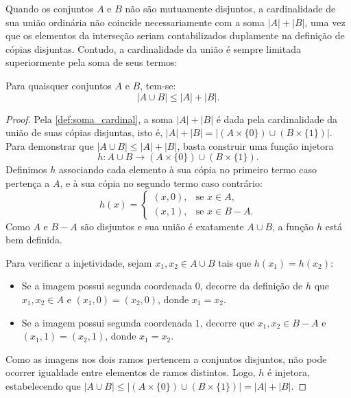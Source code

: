 Quando os conjuntos \(A\) e \(B\) não são mutuamente disjuntos, a cardinalidade de sua união ordinária não coincide necessariamente com a soma \(|A| + |B|\), uma vez que os elementos da interseção seriam contabilizados duplamente na definição de cópias disjuntas. Contudo, a cardinalidade da união é sempre limitada superiormente pela soma de seus termos:

\begin{proposicao}
    \label{prop:subaditividade_cardinal}
    Para quaisquer conjuntos \(A\) e \(B\), tem-se:
    \[
        |A \cup B| \leq |A| + |B|.
    \]
\end{proposicao}

\begin{proof}
    Pela \autoref{def:soma_cardinal}, a soma \(|A| + |B|\) é dada pela cardinalidade da união de suas cópias disjuntas, isto é, \(|A| + |B| = |(A \times \{0\}) \cup (B \times \{1\})|\). Para demonstrar que \(|A \cup B| \leq |A| + |B|\), basta construir uma função injetora
    \[
        h: A \cup B \to (A \times \{0\}) \cup (B \times \{1\}).
    \]
    Definimos \(h\) associando cada elemento à sua cópia no primeiro termo caso pertença a \(A\), e à sua cópia no segundo termo caso contrário:
    \[
        h(x) =
        \begin{cases}
            (x, 0), & \text{se } x \in A,     \\
            (x, 1), & \text{se } x \in B - A.
        \end{cases}
    \]
    Como \(A\) e \(B - A\) são disjuntos e sua união é exatamente \(A \cup B\), a função \(h\) está bem definida.

    Para verificar a injetividade, sejam \(x_1, x_2 \in A \cup B\) tais que \(h(x_1) = h(x_2)\):
    \begin{itemize}
        \item Se a imagem possui segunda coordenada \(0\), decorre da definição de \(h\) que \(x_1, x_2 \in A\) e \((x_1, 0) = (x_2, 0)\), donde \(x_1 = x_2\).
        \item Se a imagem possui segunda coordenada \(1\), decorre que \(x_1, x_2 \in B - A\) e \((x_1, 1) = (x_2, 1)\), donde \(x_1 = x_2\).
    \end{itemize}
    Como as imagens nos dois ramos pertencem a conjuntos disjuntos, não pode ocorrer igualdade entre elementos de ramos distintos. Logo, \(h\) é injetora, estabelecendo que \(|A \cup B| \leq |(A \times \{0\}) \cup (B \times \{1\})| = |A| + |B|\).
\end{proof}

